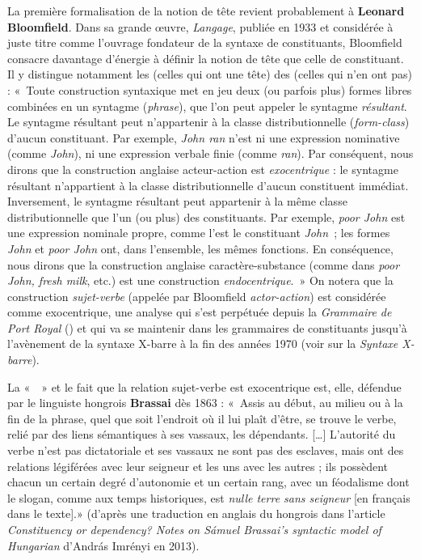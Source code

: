 {    La première formalisation de la notion de tête revient probablement à \textbf{Leonard Bloomfield}. Dans sa grande œuvre, \textit{Langage}, publiée en 1933 et considérée à juste titre comme l’ouvrage fondateur de la syntaxe de constituants, Bloomfield consacre davantage d’énergie à définir la notion de tête que celle de constituant. Il y distingue notamment les  (celles qui ont une tête) des  (celles qui n’en ont pas) : «~Toute construction syntaxique met en jeu deux (ou parfois plus) formes libres combinées en un syntagme (\textit{phrase}), que l’on peut appeler le syntagme \textit{résultant}. Le syntagme résultant peut n’appartenir à la classe distributionnelle (\textit{form-class}) d’aucun constituant. Par exemple, \textit{John ran} n’est ni une expression nominative (comme \textit{John}), ni une expression verbale finie (comme \textit{ran}). Par conséquent, nous dirons que la construction anglaise acteur-action est \textit{exocentrique} : le syntagme résultant n’appartient à la classe distributionnelle d’aucun constituent immédiat. Inversement, le syntagme résultant peut appartenir à la même classe distributionnelle que l’un (ou plus) des constituants. Par exemple, \textit{poor John} est une expression nominale propre, comme l’est le constituant \textit{John~}; les formes \textit{John} et \textit{poor John} ont, dans l’ensemble, les mêmes fonctions. En conséquence, nous dirons que la construction anglaise caractère-substance (comme dans \textit{poor John, fresh milk}, etc.) est une construction \textit{endocentrique}.~» On notera que la construction \textit{sujet-verbe} (appelée par Bloomfield \textit{actor-action}) est considérée comme exocentrique, une analyse qui s’est perpétuée depuis la \textit{Grammaire de Port Royal} (\citealt{ArnauldLancelot1660}) et qui va se maintenir dans les grammaires de constituants jusqu’à l’avènement de la syntaxe X-barre à la fin des années 1970 (voir  sur la \textit{Syntaxe X-barre}).

    La «~~» et le fait que la relation sujet-verbe est exocentrique est, elle, défendue par le linguiste hongrois \textbf{Brassai} dès 1863 : «~Assis au début, au milieu ou à la fin de la phrase, quel que soit l’endroit où il lui plaît d’être, se trouve le verbe, relié par des liens sémantiques à ses vassaux, les dépendants. […] L’autorité du verbe n’est pas dictatoriale et ses vassaux ne sont pas des esclaves, mais ont des relations légiférées avec leur seigneur et les uns avec les autres ; ils possèdent chacun un certain degré d’autonomie et un certain rang, avec un féodalisme dont le slogan, comme aux temps historiques, est \textit{nulle terre sans seigneur} [en français dans le texte].» (d’après une traduction en anglais du hongrois dans l’article \textit{Constituency or dependency? Notes on Sámuel Brassai’s syntactic model of Hungarian} d’András Imrényi en 2013).

}
